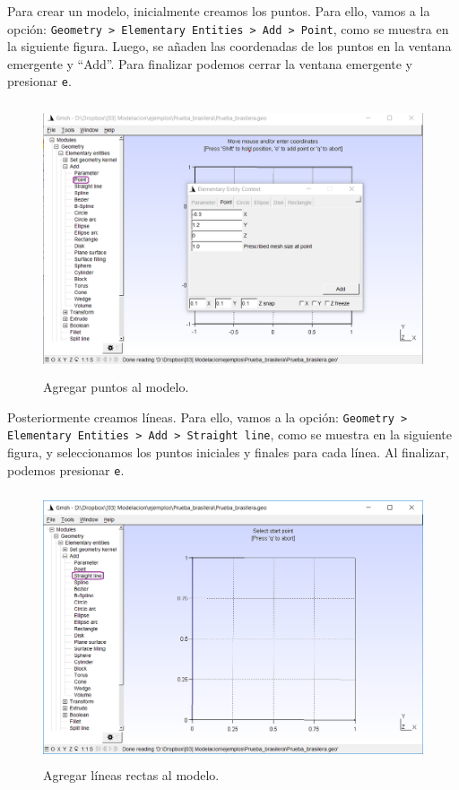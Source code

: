 \documentclass[12pt,letterpaper]{article}
\begin{document}
Para crear un modelo, inicialmente creamos los puntos. Para ello, vamos a la opción: \texttt{Geometry > Elementary Entities > Add > Point}, como se muestra en la siguiente figura. Luego, se añaden las coordenadas de los puntos en la ventana emergente y ``Add''. Para finalizar podemos cerrar la ventana emergente y presionar \texttt{e}.
\begin{figure}[H]
    \centering
    \includegraphics[height=8cm]{img/Agregar_puntos.png} 
    \caption{Agregar puntos al modelo.}
\end{figure}

Posteriormente creamos líneas. Para ello, vamos a la opción: \texttt{Geometry > Elementary Entities > Add > Straight line}, como se muestra en la siguiente figura, y seleccionamos los puntos iniciales y finales para cada línea. Al finalizar, podemos presionar \texttt{e}.
\begin{figure}[H]
    \centering
    \includegraphics[height=8cm]{img/Agregar_lineas.png} 
    \caption{Agregar líneas rectas al modelo.}
\end{figure}
\end{document}

